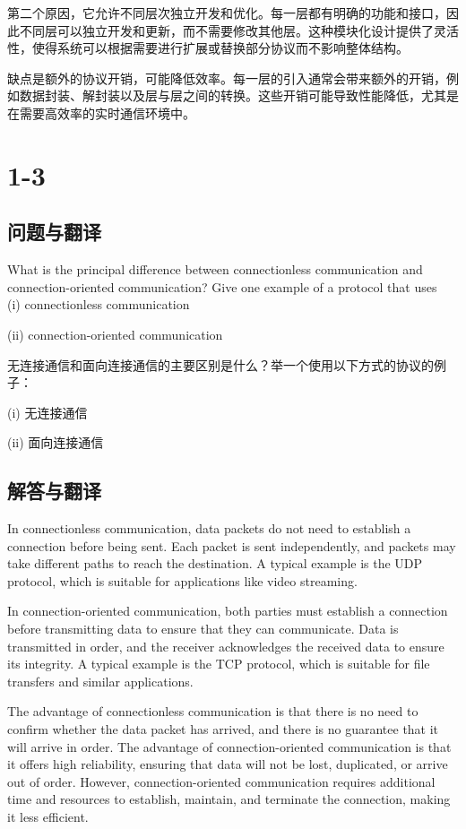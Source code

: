 第二个原因，它允许不同层次独立开发和优化。每一层都有明确的功能和接口，因此不同层可以独立开发和更新，而不需要修改其他层。这种模块化设计提供了灵活性，使得系统可以根据需要进行扩展或替换部分协议而不影响整体结构。

缺点是额外的协议开销，可能降低效率。每一层的引入通常会带来额外的开销，例如数据封装、解封装以及层与层之间的转换。这些开销可能导致性能降低，尤其是在需要高效率的实时通信环境中。

\section{1-3}

\subsection{问题与翻译}

What is the principal difference between connectionless communication and connection-oriented communication? Give one example of a protocol that uses \\

(i) connectionless communication

(ii) connection-oriented communication

无连接通信和面向连接通信的主要区别是什么？举一个使用以下方式的协议的例子：

(i) 无连接通信

(ii) 面向连接通信


\subsection{解答与翻译}

In connectionless communication, data packets do not need to establish a connection before being sent. Each packet is sent independently, and packets may take different paths to reach the destination. A typical example is the UDP protocol, which is suitable for applications like video streaming.

In connection-oriented communication, both parties must establish a connection before transmitting data to ensure that they can communicate. Data is transmitted in order, and the receiver acknowledges the received data to ensure its integrity. A typical example is the TCP protocol, which is suitable for file transfers and similar applications.

The advantage of connectionless communication is that there is no need to confirm whether the data packet has arrived, and there is no guarantee that it will arrive in order. The advantage of connection-oriented communication is that it offers high reliability, ensuring that data will not be lost, duplicated, or arrive out of order. However, connection-oriented communication requires additional time and resources to establish, maintain, and terminate the connection, making it less efficient.


